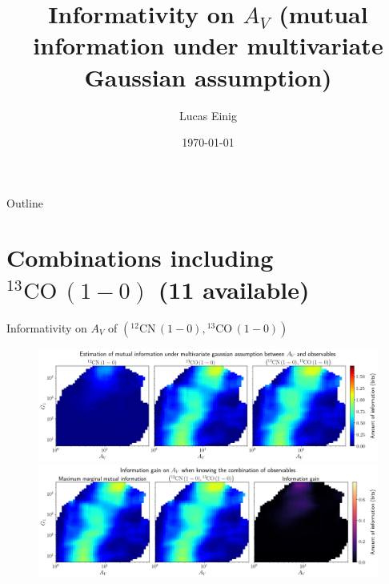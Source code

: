 \documentclass{beamer}
\title{Informativity on $A_V$ (mutual information under multivariate Gaussian assumption)}
\author{Lucas Einig}
\institute{IRAM - GIPSA-lab}
\date{\today}
\begin{document}
\begin{frame}
  \titlepage
\end{frame}

\begin{frame}{Outline}
  \tableofcontents
\end{frame}


\section{Combinations including $\mathrm{^{13}CO\,(1-0)}$ (11 available)}

\begin{frame}{Informativity on $A_V$ of $\left(\mathrm{^{12}CN\,(1-0)},\mathrm{^{13}CO\,(1-0)}\right)$}
    \begin{figure}
        \centering
        \includegraphics[width=0.95\linewidth]{../linearinfo/av__12cn10_13co10_linearinfo.png}
        \vfill
        \includegraphics[width=0.95\linewidth]{../linearinfo/av__12cn10_13co10_linearinfo_gain.png}
    \end{figure}
\end{frame}
\end{document}
